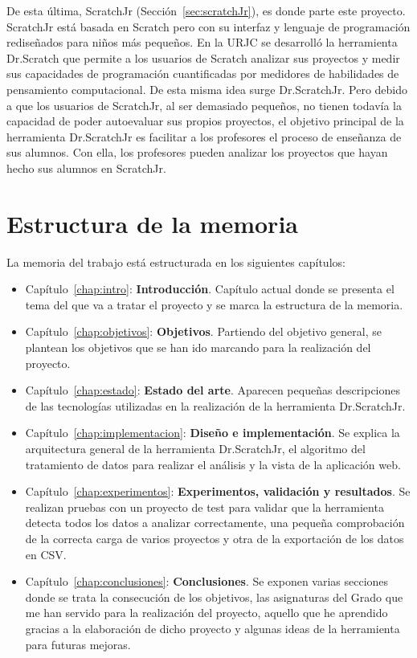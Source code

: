 \documentclass[a4paper, 12pt]{book}
\begin{document}
De esta última, ScratchJr (Sección~\ref{sec:scratchJr}), es donde parte este proyecto.
ScratchJr está basada en Scratch pero con su interfaz y lenguaje de programación rediseñados para niños más pequeños.
En la URJC se desarrolló la herramienta Dr.Scratch que permite a los usuarios de Scratch analizar sus proyectos y medir sus capacidades de programación cuantificadas por medidores de habilidades de pensamiento computacional.
De esta misma idea surge Dr.ScratchJr.
Pero debido a que los usuarios de ScratchJr, al ser demasiado pequeños, no tienen todavía la capacidad de poder autoevaluar sus propios proyectos, el objetivo principal de la herramienta Dr.ScratchJr es facilitar a los profesores el proceso de enseñanza de sus alumnos.
Con ella, los profesores pueden analizar los proyectos que hayan hecho sus alumnos en ScratchJr.

\section{Estructura de la memoria}
\label{sec:estructura}

La memoria del trabajo está estructurada en los siguientes capítulos:

\begin{itemize}
    \item Capítulo~\ref{chap:intro}: \textbf{Introducción}.
    Capítulo actual donde se presenta el tema del que va a tratar el proyecto y se marca la estructura de la memoria.
    \item Capítulo~\ref{chap:objetivos}: \textbf{Objetivos}. 
    Partiendo del objetivo general, se plantean los objetivos que se han ido marcando para la realización del proyecto.
    \item Capítulo~\ref{chap:estado}: \textbf{Estado del arte}. 
    Aparecen pequeñas descripciones de las tecnologías utilizadas en la realización de la herramienta Dr.ScratchJr.
    \item Capítulo~\ref{chap:implementacion}: \textbf{Diseño e implementación}. 
    Se explica la arquitectura general de la herramienta Dr.ScratchJr, el algoritmo del tratamiento de datos para realizar el análisis y la vista de la aplicación web.
    \item Capítulo~\ref{chap:experimentos}: \textbf{Experimentos, validación y resultados}. 
    Se realizan pruebas con un proyecto de test para validar que la herramienta detecta todos los datos a analizar correctamente, una pequeña comprobación de la correcta carga de varios proyectos y otra de la exportación de los datos en CSV.
    \item Capítulo~\ref{chap:conclusiones}: \textbf{Conclusiones}. 
    Se exponen varias secciones donde se trata la consecución de los objetivos, las asignaturas del Grado que me han servido para la realización del proyecto, aquello que he aprendido gracias a la elaboración de dicho proyecto y algunas ideas de la herramienta para futuras mejoras.
    
\end{itemize}
\end{document}
